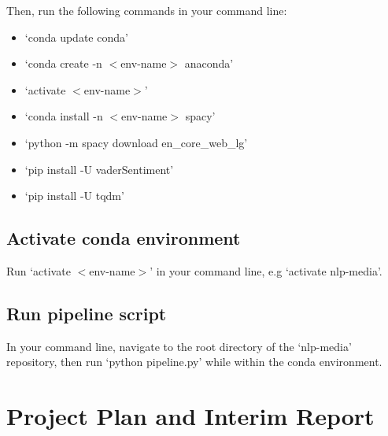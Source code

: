 \documentclass{report}
\begin{document}
\noindent Then, run the following commands in your command line:
\begin{itemize}
	\item `conda update conda'
	\item `conda create -n $<$env-name$>$ anaconda'
	\item `activate $<$env-name$>$'
	\item `conda install -n $<$env-name$>$ spacy'
	\item `python -m spacy download en\_core\_web\_lg'
	\item `pip install -U vaderSentiment'
	\item `pip install -U tqdm'
\end{itemize}

\section{Activate conda environment}

Run `activate $<$env-name$>$' in your command line, e.g `activate nlp-media'.

\section{Run pipeline script}

In your command line, navigate to the root directory of the `nlp-media' repository, then run `python pipeline.py' while within the conda environment.

\chapter{Project Plan and Interim Report}
\end{document}
